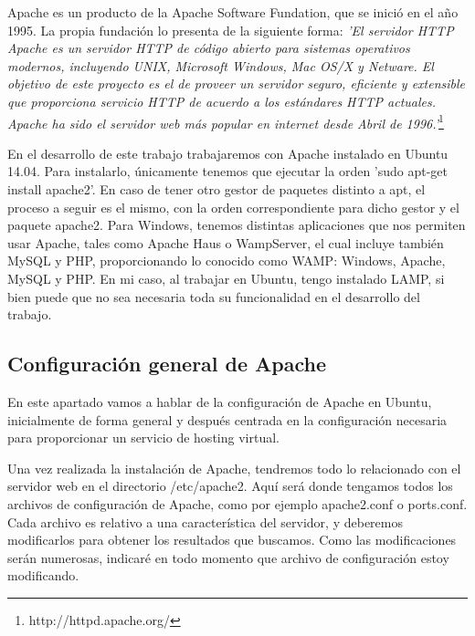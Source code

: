 \documentclass[a4paper, 10pt]{article} %
\begin{document}
Apache es un producto de la Apache Software Fundation, que se inició en el año 1995. La propia fundación lo presenta de la siguiente forma: \textit{'El servidor HTTP Apache es un servidor HTTP de código abierto para sistemas operativos modernos, incluyendo UNIX, Microsoft Windows, Mac OS/X y Netware. El objetivo de este proyecto es el de proveer un servidor seguro, eficiente y extensible que proporciona servicio HTTP de acuerdo a los estándares HTTP actuales. Apache ha sido el servidor web más popular en internet desde Abril de 1996.'}\footnote{http://httpd.apache.org/}

En el desarrollo de este trabajo trabajaremos con Apache instalado en Ubuntu 14.04. Para instalarlo, únicamente tenemos que ejecutar la orden 'sudo apt-get install apache2'. En caso de tener otro gestor de paquetes distinto a apt, el proceso a seguir es el mismo, con la orden correspondiente para dicho gestor y el paquete apache2. Para Windows, tenemos distintas aplicaciones que nos permiten usar Apache, tales como Apache Haus o WampServer, el cual incluye también MySQL y PHP, proporcionando lo conocido como WAMP: Windows, Apache, MySQL y PHP. En mi caso, al trabajar en Ubuntu, tengo instalado LAMP, si bien puede que no sea necesaria toda su funcionalidad en el desarrollo del trabajo. 


\subsection{Configuración general de Apache}


En este apartado vamos a hablar de la configuración de Apache en Ubuntu, inicialmente de forma general y después centrada en la configuración necesaria para proporcionar un servicio de hosting virtual. 

Una vez realizada la instalación de Apache, tendremos todo lo relacionado con el servidor web en el directorio /etc/apache2. Aquí será donde tengamos todos los archivos de configuración de Apache, como por ejemplo apache2.conf o ports.conf. Cada archivo es relativo a una característica del servidor, y deberemos modificarlos para obtener los resultados que buscamos. Como las modificaciones serán numerosas, indicaré en todo momento que archivo de configuración estoy modificando. 
\end{document}
